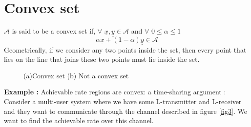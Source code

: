 \documentclass{article}
\begin{document}
\section{Convex set}
$\mathcal{A}$ is said to be a convex set if, $\forall $\vspace{5pt} $\underline{x}, \underline{y} \in \mathcal{A}$ and $\forall$ \vspace{5pt} $0\leq \alpha \leq 1$ 
\begin{equation}
	\alpha \underline{x} + (1-\alpha)\underline{y} \in \mathcal{A}
\end{equation}
Geometrically, if we consider any two points inside the set, then every point that lies on the line that joins these two points must lie inside the set.
\begin{figure}[h!]
	\centering
	 \hspace{30pt}
	\caption{(a)Convex set \hspace{20pt} (b) Not a convex set} 
	\label{fig2}
\end{figure}
\newpage
 \textbf{Example :} Achievable rate regions are convex: a time-sharing argument :
 Consider a multi-user system where we have some L-transmitter and L-receiver and they want to communicate through the channel described in figure \ref{fig3}. We want to find the achievable rate over this channel.\\ 
\end{document}
